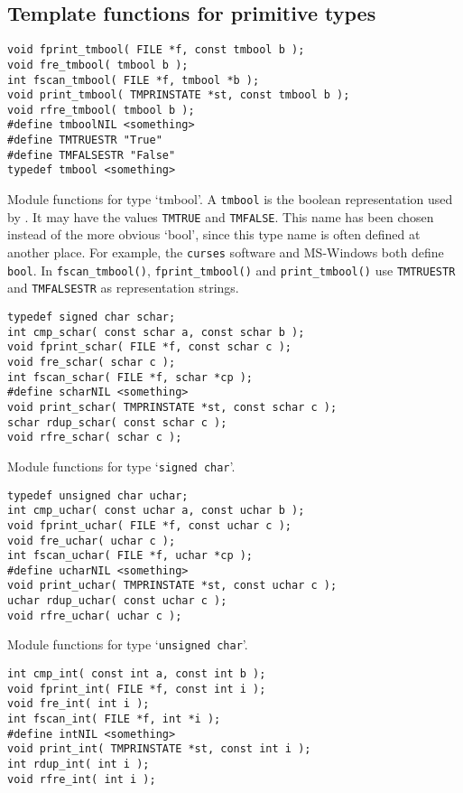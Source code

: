 \subsection{Template functions for primitive types}
\label{s.primtype}
\begin{verbatim}
void fprint_tmbool( FILE *f, const tmbool b );
void fre_tmbool( tmbool b );
int fscan_tmbool( FILE *f, tmbool *b );
void print_tmbool( TMPRINSTATE *st, const tmbool b );
void rfre_tmbool( tmbool b );
#define tmboolNIL <something>
#define TMTRUESTR "True"
#define TMFALSESTR "False"
typedef tmbool <something>
\end{verbatim}
\begin{desc}
Module functions for type `tmbool'.
A {\tt tmbool} is the boolean representation used by {\Tm}.
It may have the values {\tt TMTRUE} and {\tt TMFALSE}.
This name has been chosen instead of the more obvious `bool',
since this type name is often defined at another place.
For example, the {\tt curses} software and MS-Windows both define {\tt bool}.
In {\tt fscan\_tmbool()}, {\tt fprint\_tmbool()} and {\tt print\_tmbool()}
use {\tt TMTRUESTR} and {\tt TMFALSESTR} as representation strings.
\end{desc}
\begin{verbatim}
typedef signed char schar;
int cmp_schar( const schar a, const schar b );
void fprint_schar( FILE *f, const schar c );
void fre_schar( schar c );
int fscan_schar( FILE *f, schar *cp );
#define scharNIL <something>
void print_schar( TMPRINSTATE *st, const schar c );
schar rdup_schar( const schar c );
void rfre_schar( schar c );
\end{verbatim}
\begin{desc}
Module functions for type `{\tt signed char}'.
\end{desc}
\begin{verbatim}
typedef unsigned char uchar;
int cmp_uchar( const uchar a, const uchar b );
void fprint_uchar( FILE *f, const uchar c );
void fre_uchar( uchar c );
int fscan_uchar( FILE *f, uchar *cp );
#define ucharNIL <something>
void print_uchar( TMPRINSTATE *st, const uchar c );
uchar rdup_uchar( const uchar c );
void rfre_uchar( uchar c );
\end{verbatim}
\begin{desc}
Module functions for type `{\tt unsigned char}'.
\end{desc}
\begin{verbatim}
int cmp_int( const int a, const int b );
void fprint_int( FILE *f, const int i );
void fre_int( int i );
int fscan_int( FILE *f, int *i );
#define intNIL <something>
void print_int( TMPRINSTATE *st, const int i );
int rdup_int( int i );
void rfre_int( int i );
\end{verbatim}
